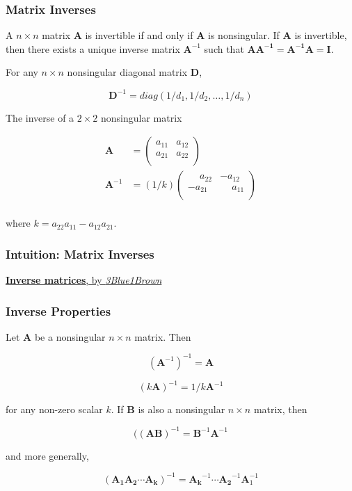 \documentclass{beamer}
\begin{document}
\begin{frame}
\frametitle{Matrix Inverses}
A $n \times n$ matrix $\mathbf{A}$ is invertible if and only if $\mathbf{A}$ is nonsingular.  If $\mathbf{A}$ is invertible, then there exists a unique inverse matrix $\mathbf{A}^{-1}$ such that $\mathbf{AA^{-1}} = \mathbf{A^{-1}A} = \mathbf{I}$.  
\vspace{5mm}

For any $n \times n$ nonsingular diagonal matrix $\mathbf{D}$,

\[ \mathbf{D}^{-1} = diag(1/d_1, 1/d_2, \hdots, 1/d_n)\]

The inverse of a $2 \times 2$ nonsingular matrix

\begin{align*}
\mathbf{A} &= \begin{pmatrix}
    a_{11} & a_{12} \\
    a_{21} & a_{22}  \\  
\end{pmatrix}\\
    \mathbf{A}^{-1} &= (1/k)\begin{pmatrix}
    \phantom{-}a_{22} & -a_{12} \\
    -a_{21} & \phantom{-}a_{11}  \\  
\end{pmatrix}\\
\end{align*}

where $k = a_{22}a_{11} - a_{12}a_{21}$.
\end{frame}

 \begin{frame}
\frametitle{Intuition: Matrix Inverses}

\href{https://www.youtube.com/watch?v=uQhTuRlWMxw&list=PLZHQObOWTQDPD3MizzM2xVFitgF8hE_ab&index=7}{\textbf{Inverse matrices}, by \textit{3Blue1Brown}}
\end{frame}

\begin{frame}
\frametitle{Inverse Properties}
Let $\mathbf{A}$ be a nonsingular $n \times n$ matrix.  Then

\[(\mathbf{A}^{-1})^{-1} = \mathbf{A}\]

\[(k\mathbf{A})^{-1} = 1/k\mathbf{A}^{-1}\]

for any non-zero scalar $k$.  If $\mathbf{B}$ is also a nonsingular $n \times n$ matrix, then 

\[((\mathbf{AB})^{-1} = \mathbf{B}^{-1}\mathbf{A}^{-1}\]

and more generally,

\[(\mathbf{A_1 A_2 \cdots A_k})^{-1} = \mathbf{A_k}^{-1}\cdots \mathbf{A_2}^{-1} \mathbf{A}_1^{-1}\]
\end{frame}
\end{document}
